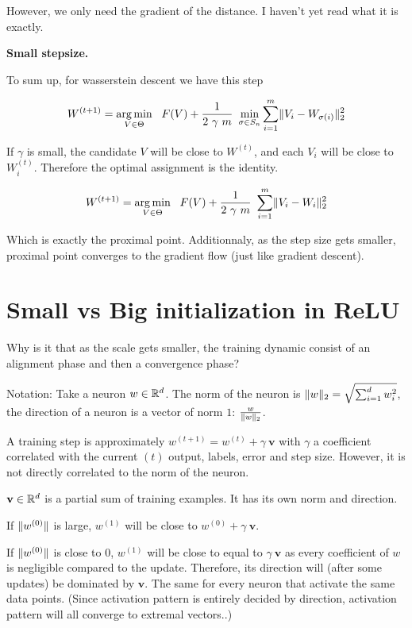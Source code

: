 However, we only need the gradient of the distance. I haven't yet read what it is exactly.

\textbf{Small stepsize.}

To sum up, for wasserstein descent we have this step

\begin{equation}
	W^{(t+1)} = \argmin_{V \in \Theta} \ \  F(V) + \frac{1}{2 ~ \gamma ~ m} ~ \min_{\sigma \in S_n} \sum_{i=1}^{m} \norm{V_i - W_{\sigma(i)}}^2_2
\end{equation}

If $\gamma$ is small, the candidate $V$ will be close to $W^{(t)}$, and each $V_i$ will be close to $W^{(t)}_i$. Therefore the optimal assignment is the identity.

\begin{equation}
	W^{(t+1)} = \argmin_{V \in \Theta} \ \  F(V) + \frac{1}{2 ~ \gamma ~ m} ~ \sum_{i=1}^{m} \norm{V_i - W_i}^2_2
\end{equation}

Which is exactly the proximal point. Additionnaly, as the step size gets smaller, proximal point converges to the gradient flow (just like gradient descent).

\section{Small vs Big initialization in ReLU}

Why is it that as the scale gets smaller, the training dynamic consist of an alignment phase and then a convergence phase?

Notation: Take a neuron $w \in \mathbb{R}^d$. The norm of the neuron is $\lVert w\rVert_2 = \sqrt{\sum_{i=1}^{d} w_i^2}$, the direction of a neuron is a vector of norm $1$: $\frac{w}{\lVert w\rVert_2}$.

A training step is approximately $w^{(t+1)} = w^{(t)} + \gamma ~ \mathbf{v}$ with $\gamma$ a coefficient correlated with the current $(t)$ output, labels, error and step size. However, it is not directly correlated to the norm of the neuron.

$\mathbf{v} \in \mathbb{R}^d$ is a partial sum of training examples. It has its own norm and direction.

If $\lVert w^{(0)}\rVert$ is large, $w^{(1)}$ will be close to $w^{(0)} + \gamma ~ \mathbf{v}$.

If $\lVert w^{(0)}\rVert$ is close to 0, $w^{(1)}$ will be close to equal to $\gamma ~ \mathbf{v}$ as every coefficient of $w$ is negligible compared to the update. Therefore, its direction will (after some updates) be dominated by $\mathbf{v}$. The same for every neuron that activate the same data points. (Since activation pattern is entirely decided by direction, activation pattern will all converge to extremal vectors..)

